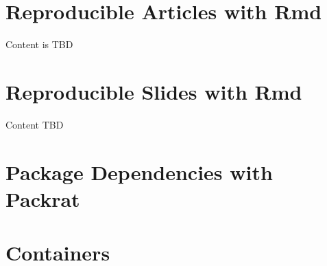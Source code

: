 \documentclass[]{book}
\theoremstyle{definition}
\theoremstyle{definition}
\theoremstyle{definition}
\theoremstyle{remark}
\begin{document}
\chapter{Reproducible Articles with
Rmd}\label{reproducible-articles-with-rmd}

Content is TBD

\chapter{Reproducible Slides with
Rmd}\label{reproducible-slides-with-rmd}

Content TBD

\chapter{Package Dependencies with
Packrat}\label{package-dependencies-with-packrat}

\chapter{Containers}\label{containers}


\end{document}
